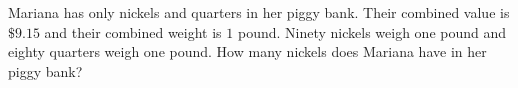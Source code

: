 Mariana has only nickels and quarters in her piggy bank. Their combined value is $\$9.15$ and their combined weight is $1$ pound. Ninety nickels weigh one pound and eighty quarters weigh one pound. How many nickels does Mariana have in her piggy bank?
